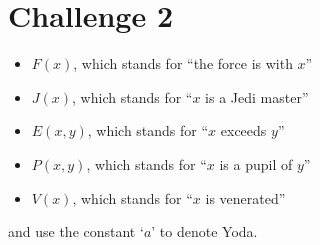 \documentclass[11pt]{article}
\begin{document}
\section*{Challenge 2}
\begin{itemize}
    \setlength{\itemsep}{-0.5ex}
    \item
    $F(x)$, which stands for ``the force is with $x$''
    \item
    $J(x)$, which stands for ``$x$ is a Jedi master''
    \item
    $E(x,y)$, which stands for ``$x$ exceeds $y$''
    \item
    $P(x,y)$, which stands for ``$x$ is a pupil of $y$''
    \item
    $V(x)$, which stands for ``$x$ is venerated''
\end{itemize}
and use the constant `$a$' to denote Yoda.
\end{document}
